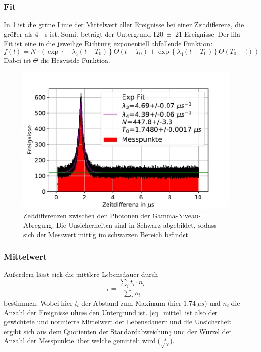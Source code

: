 \documentclass[
	a4paper,
	12pt,
	pagesize,
	ngerman
]{scrartcl}
\begin{document}
		\subsubsection*{Fit}
		In \cref{fig_zeitdifferenz} ist die grüne Linie der Mittelwert aller Ereignisse bei einer Zeitdifferenz, die größer als \SI{4}{\mu s} ist.
		Somit beträgt der Untergrund \SI{120+-21}{} Ereignisse.
		Der lila Fit ist eine in die jeweilige Richtung exponentiell abfallende Funktion:
		\begin{equation}
			\label{eq_dexp}
			f(t)=N\cdot (\exp{\left\{-\lambda_3(t-T_0)\right\}}\Theta(t-T_0)+\exp{\left\{\lambda_4(t-T_0)\right\}}\Theta(T_0-t))
		\end{equation}
		Dabei ist $\Theta$ die Heaviside-Funktion.
	\begin{figure}[H]
				\includegraphics[width= 0.9 \linewidth]{img/Zeitdifferenzen}
				\caption{
				Zeitdifferenzen zwischen den Photonen der Gamma-Niveau-Abregung.
				Die Unsicherheiten sind in Schwarz abgebildet, sodass sich der Messwert mittig im schwarzen Bereich befindet.
				}
				\label{fig_zeitdifferenz}
		\end{figure}
		\subsubsection*{Mittelwert}
		Außerdem lässt sich die mittlere Lebensdauer durch
		\begin{equation}
			\label{eq_mittel}
			\tau = \frac{\sum_i t_i \cdot n_i}{\sum_i n_i}
		\end{equation}
		bestimmen.
		Wobei hier $t_i$ der Abstand zum Maximum (hier $\SI{1.74}{\mu s}$) und $n_i$ die Anzahl der Ereignisse \textbf{ohne} den Untergrund ist.
		\cref{eq_mittel} ist also der gewichtete und normierte Mittelwert der Lebensdauern und die Unsicherheit ergibt sich aus dem Quotienten der Standardabweichung und der Wurzel der Anzahl der Messpunkte über welche gemittelt wird ($\frac{s}{\sqrt{N}}$).
\end{document}
